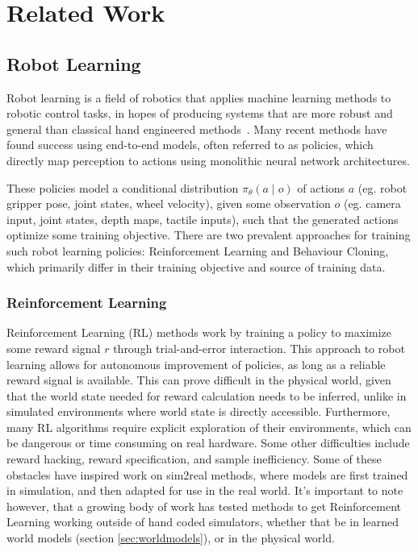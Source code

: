 \section{Related Work}

\subsection{Robot Learning}

Robot learning is a field of robotics that applies machine learning methods to robotic control tasks,
in hopes of producing systems that are more robust and general than classical hand engineered methods~\citep{capuano2025robot}.
Many recent methods have found success using end-to-end models, often referred to as policies, which directly map perception to actions using monolithic neural network architectures\cite{black2024p0, ye2026world, jiang2026robottt, chi2025diffusion}.

These policies model a conditional distribution $\pi_\theta(a \mid o)$ of actions $a$ (eg. robot gripper pose, joint states, wheel velocity), given some observation $o$ (eg. camera input, joint states, depth maps, tactile inputs), such that the generated actions optimize some training objective. There are two prevalent approaches for training such robot learning policies: Reinforcement Learning and Behaviour Cloning, which primarily differ in their training objective and source of training data.


\subsubsection{Reinforcement Learning}

Reinforcement Learning (RL) methods work by training a policy to maximize some reward signal $r$ through trial-and-error interaction\cite{tang2025deep}.
This approach to robot learning allows for autonomous improvement of policies, as long as a reliable reward signal is available. This can prove difficult in the physical world, given that the world state needed for reward calculation needs to be inferred, unlike in simulated environments where world state is directly accessible. Furthermore, many RL algorithms require explicit exploration of their environments, which can be dangerous or time consuming on real hardware. Some other difficulties include reward hacking, reward specification, and sample inefficiency. Some of these obstacles have inspired work on sim2real methods, where models are first trained in simulation, and then adapted for use in the real world. %
It's important to note however, that a growing body of work has tested methods to get Reinforcement Learning working outside of hand coded simulators, whether that be in learned world models (section \ref{sec:worldmodels}), or in the physical world.


